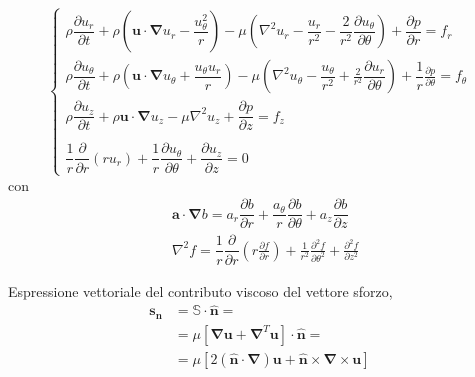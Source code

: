 \begin{equation}
  \begin{cases}
    \rho \dfrac{\partial u_r}{\partial t}
    + \rho \left( \bm{u} \cdot \bm{\nabla}u_r - \dfrac{u_\theta^2}{r} \right)
    - \mu \left(\nabla^2 u_r 
       - \dfrac{u_r}{r^2} 
       - \dfrac{2}{r^2}\dfrac{\partial u_\theta}{\partial \theta} \right)  
       + \dfrac{\partial p}{\partial r} = f_r \\
    \rho \dfrac{\partial u_\theta}{\partial t}
    + \rho \left( \bm{u} \cdot \bm{\nabla} u_\theta + \dfrac{u_\theta u_r}{r} \right)
    - \mu \left(\nabla^2 u_\theta 
       - \dfrac{u_\theta}{r^2} 
       + \frac{2}{r^2}\dfrac{\partial u_r}{\partial \theta}  \right) 
    + \dfrac{1}{r} \frac{\partial p}{\partial \theta} = f_\theta\\
    \rho \dfrac{\partial u_z}{\partial t}
    + \rho \bm{u} \cdot \bm{\nabla} u_z
    - \mu \nabla^2 u_z
    + \dfrac{\partial p}{\partial z} = f_z \\ \\
    \dfrac{1}{r}\dfrac{\partial}{\partial r}\left( r u_r \right) 
    + \dfrac{1}{r}\dfrac{\partial u_\theta}{\partial \theta} 
    + \dfrac{\partial u_z}{\partial z} = 0
  \end{cases}
  \end{equation}
  con 
  \begin{equation}
  \begin{aligned}
  & \bm{a} \cdot \bm{\nabla} b = a_r \dfrac{\partial b}{\partial r} 
     + \dfrac{a_\theta}{r} \dfrac{\partial b}{\partial \theta}  
     + a_z \dfrac{\partial b}{\partial z} \\
  & \nabla^2 f = \dfrac{1}{r}\dfrac{\partial}{\partial r}
                      \left(r \frac{\partial f}{\partial r} \right) +
               \frac{1}{r^2} \frac{\partial^2 f}{\partial \theta^2} + 
               \frac{\partial^2 f}{\partial z^2} 
  \end{aligned}
  \end{equation}
  
\vspace{0.5cm}
Espressione vettoriale del contributo viscoso del vettore sforzo,
\begin{equation}
\begin{aligned}
  \bm{s_n} & = \mathbb{S} \cdot \bm{\hat{n}} = \\
           & = \mu [\bm{\nabla} \bm{u} + \bm{\nabla}^T \bm{u}] \cdot \bm{\hat{n}} = \\
           & = \mu \left[ 2 (\bm{\hat{n}} \cdot \bm{\nabla} ) \bm{u} + \bm{\hat{n}} \times \bm{\nabla} \times \bm{u}  \right]
\end{aligned}
\end{equation}

